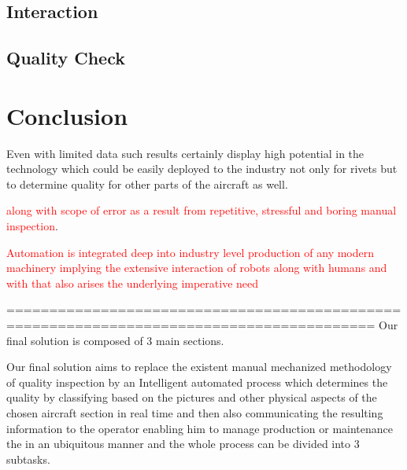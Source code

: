 \documentclass{article}
\begin{document}
\subsection{Interaction}

\quad\quad

\subsection{Quality Check}

\section{Conclusion}

Even with limited data such results certainly display high potential in the technology which could be easily deployed to the industry not only for rivets but to determine quality for other parts of the aircraft as well.


\textcolor{red}{along with scope of error as a result from repetitive, stressful and boring  manual inspection}.

\textcolor{red}{Automation is integrated deep into industry level production of any modern machinery implying the extensive interaction of robots along with humans and with that also arises the underlying imperative need} 






=========================================================================================
Our final solution is composed of 3 main sections.

Our final solution aims to replace the existent manual mechanized methodology of quality inspection by an Intelligent automated process which determines
the quality by classifying based on the pictures and other physical aspects of the
chosen aircraft section in real time and then also communicating the resulting information to the operator enabling him to manage production or maintenance  the in an ubiquitous manner and the whole process can be divided into 3 subtasks.
\end{document}
